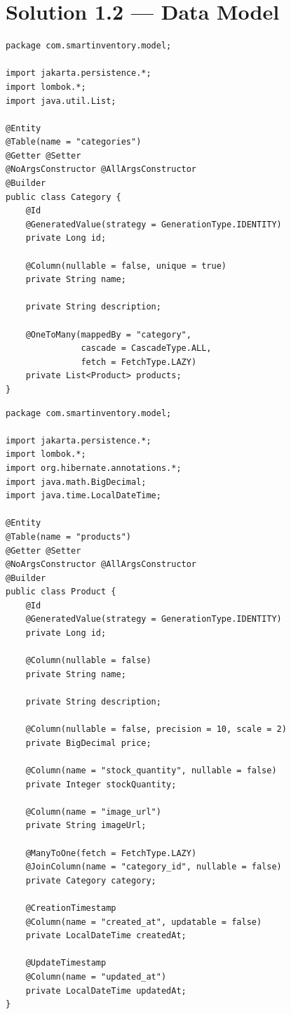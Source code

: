 \documentclass[12pt,a4paper]{report}
\begin{document}
\section{Solution 1.2 --- Data Model}

\begin{lstlisting}[style=javastyle, title={model/Category.java}]
package com.smartinventory.model;

import jakarta.persistence.*;
import lombok.*;
import java.util.List;

@Entity
@Table(name = "categories")
@Getter @Setter
@NoArgsConstructor @AllArgsConstructor
@Builder
public class Category {
    @Id
    @GeneratedValue(strategy = GenerationType.IDENTITY)
    private Long id;

    @Column(nullable = false, unique = true)
    private String name;

    private String description;

    @OneToMany(mappedBy = "category",
               cascade = CascadeType.ALL,
               fetch = FetchType.LAZY)
    private List<Product> products;
}
\end{lstlisting}

\begin{lstlisting}[style=javastyle, title={model/Product.java}]
package com.smartinventory.model;

import jakarta.persistence.*;
import lombok.*;
import org.hibernate.annotations.*;
import java.math.BigDecimal;
import java.time.LocalDateTime;

@Entity
@Table(name = "products")
@Getter @Setter
@NoArgsConstructor @AllArgsConstructor
@Builder
public class Product {
    @Id
    @GeneratedValue(strategy = GenerationType.IDENTITY)
    private Long id;

    @Column(nullable = false)
    private String name;

    private String description;

    @Column(nullable = false, precision = 10, scale = 2)
    private BigDecimal price;

    @Column(name = "stock_quantity", nullable = false)
    private Integer stockQuantity;

    @Column(name = "image_url")
    private String imageUrl;

    @ManyToOne(fetch = FetchType.LAZY)
    @JoinColumn(name = "category_id", nullable = false)
    private Category category;

    @CreationTimestamp
    @Column(name = "created_at", updatable = false)
    private LocalDateTime createdAt;

    @UpdateTimestamp
    @Column(name = "updated_at")
    private LocalDateTime updatedAt;
}
\end{lstlisting}
\end{document}
